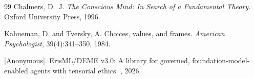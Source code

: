 \documentclass[12pt,letterpaper]{article}
\theoremstyle{definition}
\theoremstyle{plain}
\begin{document}
\begin{thebibliography}{99}
Chalmers, D.~J.
\newblock \emph{The Conscious Mind: In Search of a Fundamental Theory}.
\newblock Oxford University Press, 1996.

Kahneman, D. and Tversky, A.
\newblock Choices, values, and frames.
\newblock \emph{American Psychologist}, 39(4):341--350, 1984.

[Anonymous].
\newblock ErisML/DEME v3.0: A library for governed, foundation-model-enabled agents with tensorial ethics.
, 2026.

\end{thebibliography}
\end{document}
